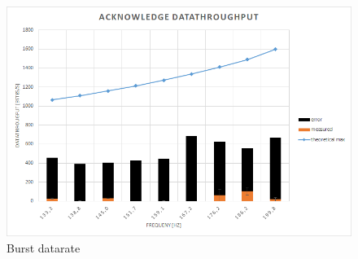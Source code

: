\begin{description}
	\begin{figure}[h]
		\centering
		\includegraphics[scale=0.5]{./pics/exp4_detail.png}
		\caption{Burst datarate}\label{fig:exp4between}
	\end{figure}
\end{description}
\newpage


